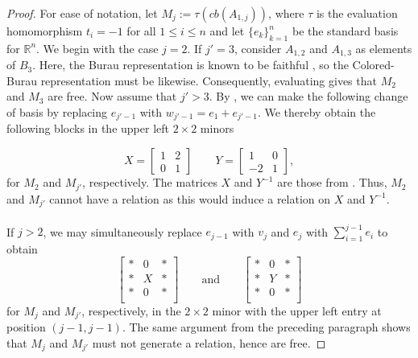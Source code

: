 \documentclass[11pt]{article}
\begin{document}
\begin{proof}
For ease of notation, let $M_j:=\tau(cb(A_{1,j}))$,  where $\tau$ is the evaluation homomorphism $t_i=-1$ for all $1\leq i\leq n$ and let $\{e_k\}_{k=1}^n$ be the standard basis for $\mathbb{R}^n$. We begin with the case $j=2$. If $j'=3$, consider $A_{1,2}$ and $A_{1,3}$ as elements of $B_3$. Here, the Burau representation is known to be faithful \cite{big-bur}, so the Colored-Burau representation must be likewise. Consequently, evaluating gives that $M_2$ and $M_3$ are free. Now assume that $j'>3$. By , we can make the following change of basis by replacing $e_{j'-1}$ with $w_{j'-1}=e_1+e_{j'-1}$. We thereby obtain the following blocks in the upper left $2\times 2$ minors

$$X=\begin{bmatrix}
1 & 2\\
0 & 1
\end{bmatrix} \qquad 
Y=\begin{bmatrix}
1 & 0\\
-2 & 1
\end{bmatrix},$$
for $M_2$ and $M_{j'}$, respectively. The matrices $X$ and $Y^{-1}$ are those from . Thus, $M_2$ and $M_{j'}$ cannot have a relation as this would induce a relation on $X$ and $Y^{-1}$.
\\
\\
If $j>2$, we may simultaneously replace $e_{j-1}$ with 
$v_j$ and $e_j$ with $\sum\limits_{i=1}^{j-1}e_i$ to obtain 
$$
\begin{bmatrix}
	* & 0 & *\\
	* & X & *\\
	* & 0 & *\\
\end{bmatrix}
\qquad \text{and} \qquad
\begin{bmatrix}
	* & 0 & *\\
	* & Y & *\\
	* & 0 & *\\
\end{bmatrix}
$$
for $M_j$ and $M_{j'}$, respectively, in the $2\times 2$ minor with the upper left entry at position $(j-1,j-1)$. The same argument from the preceding paragraph shows that $M_j$ and $M_{j'}$ must not generate a relation, hence are free.
\end{proof}
\end{document}
